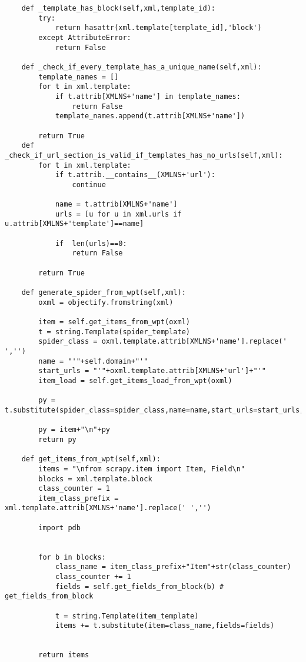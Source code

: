 \begin{lstlisting}
    def _template_has_block(self,xml,template_id):
        try:
            return hasattr(xml.template[template_id],'block')
        except AttributeError:
            return False
   
    def _check_if_every_template_has_a_unique_name(self,xml):
        template_names = []
        for t in xml.template:
            if t.attrib[XMLNS+'name'] in template_names:
                return False
            template_names.append(t.attrib[XMLNS+'name'])

        return True
    def _check_if_url_section_is_valid_if_templates_has_no_urls(self,xml):
        for t in xml.template:
            if t.attrib.__contains__(XMLNS+'url'):
                continue

            name = t.attrib[XMLNS+'name']
            urls = [u for u in xml.urls if u.attrib[XMLNS+'template']==name]

            if  len(urls)==0:
                return False

        return True

    def generate_spider_from_wpt(self,xml):
        oxml = objectify.fromstring(xml)

        item = self.get_items_from_wpt(oxml)
        t = string.Template(spider_template)
        spider_class = oxml.template.attrib[XMLNS+'name'].replace(' ','')
        name = "'"+self.domain+"'"
        start_urls = "'"+oxml.template.attrib[XMLNS+'url']+"'"
        item_load = self.get_items_load_from_wpt(oxml) 

        py = t.substitute(spider_class=spider_class,name=name,start_urls=start_urls,item_load=item_load)
        
        py = item+"\n"+py
        return py
    
    def get_items_from_wpt(self,xml):
        items = "\nfrom scrapy.item import Item, Field\n"
        blocks = xml.template.block
        class_counter = 1
        item_class_prefix = xml.template.attrib[XMLNS+'name'].replace(' ','')
        
        import pdb
        

        for b in blocks:
            class_name = item_class_prefix+"Item"+str(class_counter) 
            class_counter += 1
            fields = self.get_fields_from_block(b) # get_fields_from_block

            t = string.Template(item_template) 
            items += t.substitute(item=class_name,fields=fields)


        return items
    

\end{lstlisting}
